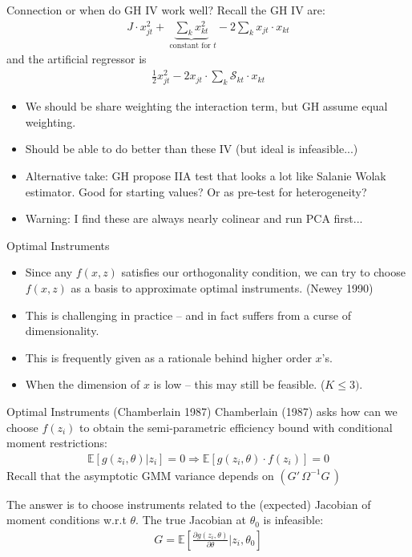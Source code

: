 \begin{frame}{Connection or when do GH IV work well?}
Recall the GH IV are:
\begin{align*}
J \cdot x_{jt}^2 + \underbrace{\sum_k x_{kt}^2}_{\text{ constant for } t } - 2 \sum_k x_{jt} \cdot x_{kt}
\end{align*}
and the artificial regressor is
\begin{align*}
\frac{1}{2} x_{jt}^2 - 2 x_{jt} \cdot \sum_k \mathcal{S}_{kt}  \cdot x_{kt}
\end{align*}
\begin{itemize}
\item We should be \alert{share weighting} the interaction term, but GH assume equal weighting.\\
\item Should be able to do better than these IV (but ideal is infeasible...)
\item Alternative take: GH propose IIA test that looks a lot like Salanie Wolak estimator. Good for starting values? Or as pre-test for heterogeneity?
\item Warning: I find these are always nearly colinear and run PCA first...
\end{itemize}
\end{frame}


\begin{frame}{Optimal Instruments}
\begin{itemize}
\item Since any $f(x,z)$ satisfies our orthogonality condition, we can try to choose $f(x,z)$ as a \alert{basis} to approximate optimal instruments. (Newey 1990)
\item This is challenging in practice -- and in fact suffers from a curse of dimensionality.
\item This is frequently given as a rationale behind higher order $x$'s.
\item When the dimension of $x$ is low -- this may still be feasible. ($K \leq 3)$.
\end{itemize}
\end{frame}



\begin{frame}{Optimal Instruments (Chamberlain 1987)}
Chamberlain (1987) asks how can we choose $f(z_i)$ to obtain the semi-parametric efficiency bound with conditional moment restrictions:
\begin{align*}
\mathbb{E}[g(z_i,\theta) | z_i]=0 \Rightarrow \mathbb{E}[g(z_i,\theta) \cdot f(z_i) ]=0 
\end{align*}
Recall that the asymptotic GMM variance depends on $(G'\, \Omega^{-1} G\,)$

The answer is to choose instruments related to the (expected) Jacobian of moment conditions w.r.t $\theta$. The true Jacobian at $\theta_0$ is \alert{infeasible}:
\begin{align*}
G=\mathbb{E}\left[\frac{\partial g(z_i,\theta)}{\partial \theta} | z_i, \theta_0 \right]
\end{align*}
\end{frame}


